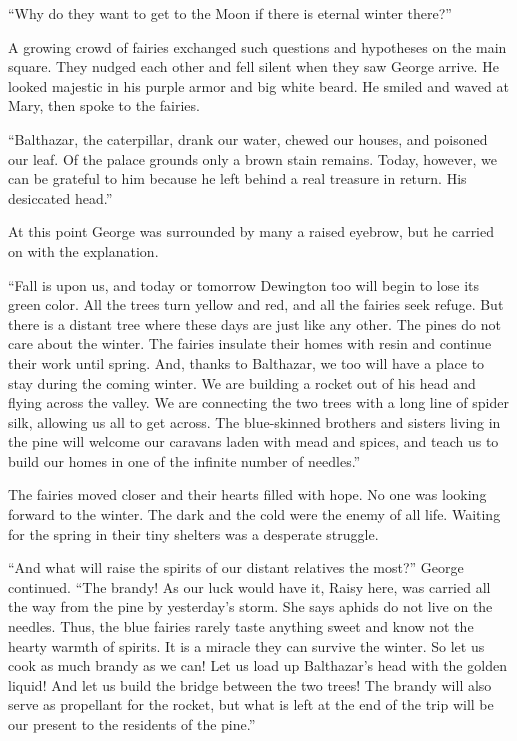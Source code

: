 \documentclass[10pt, draft]{memoir}
\begin{document}
``Why do they want to get to the Moon if there is eternal winter there?''

A growing crowd of fairies exchanged such questions and hypotheses on the main square. They nudged each other and fell silent when they saw George arrive. He looked majestic in his purple armor and big white beard. He smiled and waved at Mary, then spoke to the fairies.

``Balthazar, the caterpillar, drank our water, chewed our houses, and poisoned our leaf. Of the palace grounds only a brown stain remains. Today, however, we can be grateful to him because he left behind a real treasure in return. His desiccated head.''

At this point George was surrounded by many a raised eyebrow, but he carried on with the explanation.

``Fall is upon us, and today or tomorrow Dewington too will begin to lose its green color. All the trees turn yellow and red, and all the fairies seek refuge. But there is a distant tree where these days are just like any other. The pines do not care about the winter. The fairies insulate their homes with resin and continue their work until spring. And, thanks to Balthazar, we too will have a place to stay during the coming winter. We are building a rocket out of his head and flying across the valley. We are connecting the two trees with a long line of spider silk, allowing us all to get across. The blue-skinned brothers and sisters living in the pine will welcome our caravans laden with mead and spices, and teach us to build our homes in one of the infinite number of needles.''

The fairies moved closer and their hearts filled with hope. No one was looking forward to the winter. The dark and the cold were the enemy of all life. Waiting for the spring in their tiny shelters was a desperate struggle.

``And what will raise the spirits of our distant relatives the most?'' George continued. ``The brandy! As our luck would have it, Raisy here, was carried all the way from the pine by yesterday's storm. She says aphids do not live on the needles. Thus, the blue fairies rarely taste anything sweet and know not the hearty warmth of spirits. It is a miracle they can survive the winter. So let us cook as much brandy as we can! Let us load up Balthazar's head with the golden liquid! And let us build the bridge between the two trees! The brandy will also serve as propellant for the rocket, but what is left at the end of the trip will be our present to the residents of the pine.''
\end{document}
